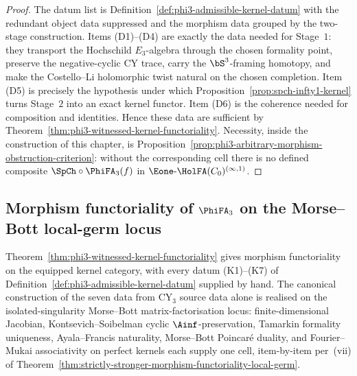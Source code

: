 \begin{proof}
The datum list is Definition~\ref{def:phi3-admissible-kernel-datum}
with the redundant object data suppressed and the morphism data grouped
by the two-stage construction. Items \textup{(D1)--(D4)} are exactly
the data needed for Stage~$1$: they transport the Hochschild
$E_3$-algebra through the chosen formality point, preserve the
negative-cyclic CY trace, carry the $\bS^3$-framing homotopy, and make
the Costello--Li holomorphic twist natural on the chosen completion.
Item \textup{(D5)} is precisely the hypothesis under which
Proposition~\ref{prop:spch-infty1-kernel} turns Stage~$2$ into an exact
kernel functor. Item \textup{(D6)} is the coherence needed for
composition and identities. Hence these data are sufficient by
Theorem~\ref{thm:phi3-witnessed-kernel-functoriality}. Necessity,
inside the construction of this chapter, is
Proposition~\ref{prop:phi3-arbitrary-morphism-obstruction-criterion}:
without the corresponding cell there is no defined composite
$\SpCh\circ\PhiFA_3(f)$ in
$\Eone\text{-}\HolFA(C_0)^{(\infty,1)}$.
\end{proof}

\subsection{Morphism functoriality of \texorpdfstring{$\PhiFA_3$}{PhiFA-3} on the Morse--Bott local-germ locus}
\label{sec:morphism-functoriality-phi-fa-3}

Theorem~\ref{thm:phi3-witnessed-kernel-functoriality} gives morphism
functoriality on the equipped kernel category, with every datum
\textup{(K1)}--\textup{(K7)} of
Definition~\ref{def:phi3-admissible-kernel-datum} supplied by hand.
The canonical construction of the seven data from CY$_3$ source
data alone is realised on the isolated-singularity Morse--Bott
matrix-factorisation locus: finite-dimensional Jacobian,
Kontsevich--Soibelman cyclic $\Ainf$-preservation, Tamarkin formality
uniqueness, Ayala--Francis naturality, Morse--Bott Poincar\'e duality,
and Fourier--Mukai associativity on perfect kernels each supply one
cell, item-by-item per~(vii) of
Theorem~\ref{thm:strictly-stronger-morphism-functoriality-local-germ}.

